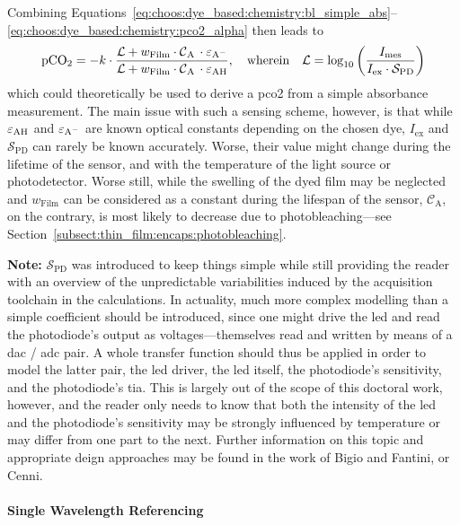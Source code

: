 Combining Equations~\ref{eq:choos:dye_based:chemistry:bl_simple_abs}--\ref{eq:choos:dye_based:chemistry:pco2_alpha} then leads to
\begin{equation}
	\ce{pCO_2} = - k \cdot \frac{\mathcal{L} + w_\text{Film} \cdot \ce{ \mathcal{C}_A \cdot \varepsilon_{A^-}} }{ \mathcal{L} + w_\text{Film} \cdot \ce{ \mathcal{C}_A \cdot \varepsilon_{AH}} }, \quad \text{wherein} \quad \mathcal{L} = \log_{10} \left( \frac{I_\text{mes}}{I_\text{ex}\cdot \mathcal{S}_\text{PD}} \right)
\end{equation}
which could theoretically be used to derive a \gls{pco2} from a simple absorbance measurement. The main issue with such a sensing scheme, however, is that while $\ce{\varepsilon_{AH}}$ and $\ce{\varepsilon_{A^-}}$ are known optical constants depending on the chosen dye, $I_\text{ex}$ and $\mathcal{S}_\text{PD}$ can rarely be known accurately. Worse, their value might change during the lifetime of the sensor, and with the temperature of the light source\cite{reynolds1991} or photodetector\cite{ahmad1979}. Worse still, while the swelling of the dyed film may be neglected and $w_\text{Film}$ can be considered as a constant during the lifespan of the sensor, $\mathcal{C}_\text{A}$, on the contrary, is most likely to decrease due to photobleaching---see Section~\ref{subsect:thin_film:encaps:photobleaching}.

\textbf{Note:} $\mathcal{S}_\text{PD}$ was introduced to keep things simple while still providing the reader with an overview of the unpredictable variabilities induced by the acquisition toolchain in the calculations. In actuality, much more complex modelling than a simple coefficient should be introduced, since one might drive the \gls{led} and read the photodiode's output as voltages---themselves read and written by means of a \gls{dac} / \gls{adc} pair. A whole transfer function should thus be applied in order to model the latter pair, the \gls{led} driver, the \gls{led} itself, the photodiode's sensitivity, and the photodiode's \gls{tia}. This is largely out of the scope of this doctoral work, however, and the reader only needs to know that both the intensity of the \gls{led} and the photodiode's sensitivity may be strongly influenced by temperature or may differ from one part to the next. Further information on this topic and appropriate deign approaches may be found in the work of Bigio and Fantini\cite[Chap.~13]{bigio2016}, or Cenni\cite{cenni2012}.

\paragraph{Single Wavelength Referencing}\mbox{}\\

